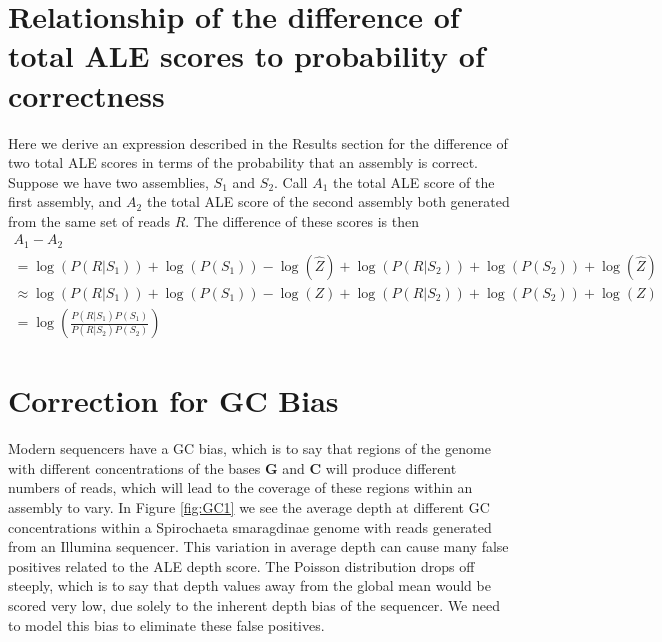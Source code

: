 \documentclass[phd,tocprelim]{cornell}
\begin{document}

\section{Relationship of the difference of total ALE scores to probability of correctness} %
\label{sec:Relationship of the difference of total ALE scores to probability of correctness}

Here we derive an expression described in the Results section for the difference of two total ALE scores in terms of the probability that an assembly is correct.  Suppose we have two assemblies, $S_{1}$ and $S_{2}$.  Call $A_{1}$ the total ALE score of the first assembly, and $A_{2}$ the total ALE score of the second assembly both generated from the same set of reads $R$. The difference of these scores is then
\begin{equation}
    \begin{array}{l}
        A_{1} - A_{2} \\
        = \log\left(P\left(R|S_{1}\right)\right) + \log\left(P\left(S_{1}\right)\right) - \log\left(\hat{Z}\right) + \log\left(P\left(R|S_{2}\right)\right) + \log\left(P\left(S_{2}\right)\right) + \log\left(\hat{Z}\right) \\
        \approx \log\left(P\left(R|S_{1}\right)\right) + \log\left(P\left(S_{1}\right)\right) - \log\left(Z\right) + \log\left(P\left(R|S_{2}\right)\right) + \log\left(P\left(S_{2}\right)\right) + \log\left(Z\right) \\
        = \log\left(\frac{P\left(R|S_{1}\right)P\left(S_{1}\right)}{P\left(R|S_{2}\right)P\left(S_{2}\right)}\right)
    \end{array}
\end{equation}


\section{Correction for GC Bias} %
\label{sec:GCBias}

Modern sequencers have a GC bias, which is to say that regions of the genome with different concentrations of the bases {\bf G} and {\bf C} will produce different numbers of reads, which will lead to the coverage of these regions within an assembly to vary. In Figure \ref{fig:GC1} we see the average depth at different GC concentrations within a Spirochaeta smaragdinae genome with reads generated from an Illumina sequencer. This variation in average depth can cause many false positives related to the ALE depth score. The Poisson distribution drops off steeply, which is to say that depth values away from the global mean would be scored very low, due solely to the inherent depth bias of the sequencer. We need to model this bias to eliminate these false positives.
\end{document}

